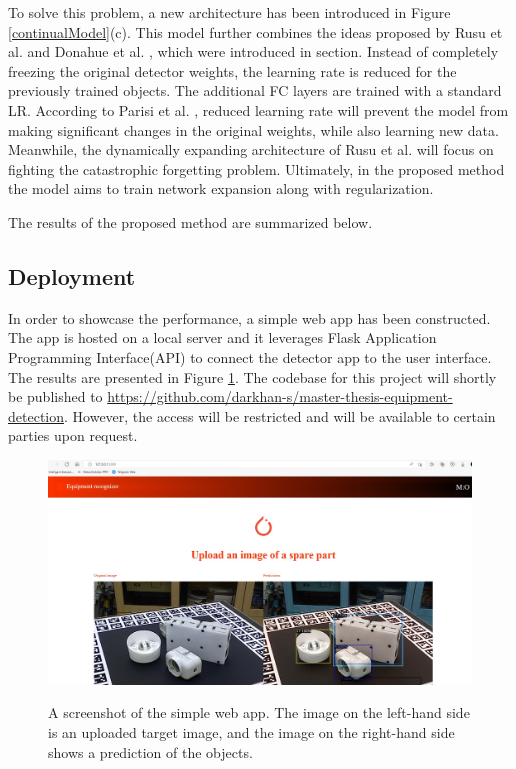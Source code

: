 \documentclass[english, 12pt, a4paper, elec, utf8, a-1b, online]{aaltothesis}
\begin{document}
To solve this problem, a new architecture has been introduced in Figure \ref{continualModel}(c). This model further combines the ideas proposed by Rusu et al. \cite{Rusu2016} and Donahue et al. \cite{Donahue2013}, which were introduced in  section. Instead of completely freezing the original detector weights, the learning rate is reduced for the previously trained objects. The additional FC layers are trained with a standard LR.  According to Parisi et al. \cite{Parisi2018}, reduced learning rate will prevent the model from making significant changes in the original weights, while also learning new data. Meanwhile, the dynamically expanding architecture of Rusu et al. \cite{Rusu2016} will focus on fighting the catastrophic forgetting problem. Ultimately, in the proposed method the model aims to train network expansion along with regularization. 

The results of the proposed method are summarized below.  

\subsection{Deployment}
In order to showcase the performance, a simple web app has been constructed. The app is hosted on a local server and it leverages Flask Application Programming Interface(API) to connect the detector app to the user interface. The results are presented in Figure \ref{demo}. The codebase for this project will shortly be published to \url{https://github.com/darkhan-s/master-thesis-equipment-detection}. However, the access will be restricted and will be available to certain parties upon request.  

\begin{figure}[htb]
	\begin{center}
		\includegraphics[width=14cm]{./demo.png}
	\end{center}
	\caption{A screenshot of the simple web app. The image on the left-hand side is an uploaded target image, and the image on the right-hand side shows a prediction of the objects.}
	\begin{center}
		\label{demo}
	\end{center}
\end{figure}
\FloatBarrier
\end{document}
